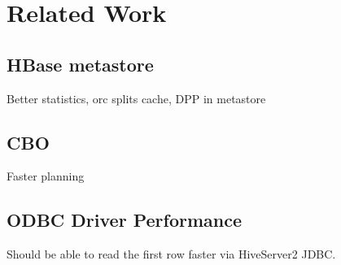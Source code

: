 \section{Related Work}

\subsection{HBase metastore}

Better statistics, orc splits cache, DPP in metastore

\subsection{CBO}

Faster planning 

\subsection{ODBC Driver Performance}

Should be able to read the first row faster via HiveServer2 JDBC.

